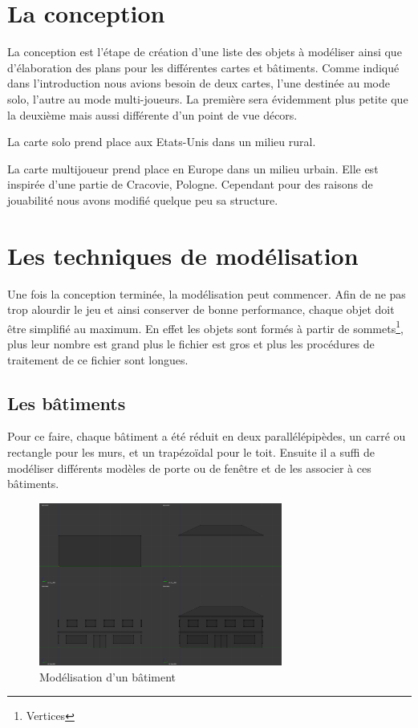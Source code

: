 \documentclass[11pt]{report}
\begin{document}
\section{La conception}

La conception est l’étape de création d’une liste des objets à modéliser ainsi que d’élaboration des plans pour les différentes cartes et bâtiments. Comme indiqué dans l’introduction nous avions besoin de deux cartes, l’une destinée au mode solo, l’autre au mode multi-joueurs. La première sera évidemment plus petite que la deuxième mais aussi différente d’un point de vue décors.

La carte solo prend place aux Etats-Unis dans un milieu rural.

La carte multijoueur prend place en Europe dans un milieu urbain. Elle est inspirée d’une partie de Cracovie, Pologne. Cependant pour des raisons de jouabilité nous avons modifié quelque peu sa structure.

\section{Les techniques de modélisation}

Une fois la conception terminée, la modélisation peut commencer. Afin de ne pas trop alourdir le jeu et ainsi conserver de bonne performance, chaque objet doit être simplifié au maximum. En effet les objets sont formés à partir de sommets\footnote{Vertices}, plus leur nombre est grand plus le fichier est gros et plus les procédures de traitement de ce fichier sont longues.

\subsection{Les bâtiments}

Pour ce faire, chaque bâtiment a été réduit en deux parallélépipèdes, un carré ou rectangle pour les murs, et un trapézoïdal pour le toit. Ensuite il a suffi de modéliser différents modèles de porte ou de fenêtre et de les associer à ces bâtiments.

\begin{figure}[htbp]
\centering
\includegraphics[width=8cm]{batiment.png}
\caption{Modélisation d'un bâtiment}
\end{figure}
\end{document}
